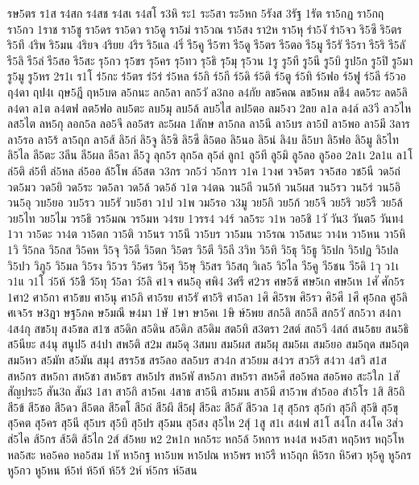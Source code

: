 {รษ5ตร
ร1ส
ร4สก
ร4สช
ร4สเ
ร4สโ
ร3หิ
ระ1
ระ5สา
ระ5หก
5รังส
3รัฐ
1รัต
รา5กฏ
รา5กฤ
รา5กว
1ราช
รา5ชู
รา5ดร
รา5ดว
รา5ดู
รา5ม่
รา5วณ
รา5สง
รา2ห
รา5หุ
รำ5งั
รำ5จว
ริ5ซึ
ริ5ตร
ริ5ทึ
4ริพ
ริ5มน
4ริยจ
4ริยย
4ริร
ริ5แล
4ริ่
รี5คู
รี5ฑา
รี5ดู
รี5ตร
รี5ตอ
รี5มู
รี5รั
รี5รา
รี5ริ
รี5ลั
รี5ลิ
รี5ล่
รี5สอ
รี5สะ
รุ5กว
รุ5ขร
รุ5คร
รุ5ทว
รุ5ธิ
รุ5มุ
รุ5วน
1รู
รู5ที
รู5นี
รู5บิ
รูป5ก
รู5ปิ
รู5มา
รู5มู
รู5หร
2ร1เ
ร1โ
ร่5กะ
ร่5ตร
ร่5ร่
ร่5หล
ร์5กิ
ร์5กี
ร์5ดิ
ร์5ติ
ร์5ตู
ร์5ทิ
ร์5ฟอ
ร์5ฟู
ร์5ลี
ร์5วอ
ฤ4ดา
ฤป4เ
ฤษ5ฎี
ฤห5บด
ล5กนะ
ลก5ลา
ลก5วั
ล3กอ
ล4กัย
ลข5คณ
ลข5หม
ลชี4
ลด5ระ
ลด5ลิ
ล4ดา
ล1ต
ล4ตฟ
ลต5ฟอ
ลบ5ตะ
ลบ5มุ
ลบ5ล้
ลบ5ไส
ลป5ตอ
ลม5งว
2ลย
ล1ล
ล4ล์
ล3วี
ลว5ไห
ลส5ไต
ลห5กุ
ลอก5ล
ลอ5จี
ลอ5สร
ละ5ผล
1ลักษ
ลา5กล
ลา5นี
ลา5บร
ลา5ป๋
ลา5พอ
ลา5มี
3ลาร
ลา5รอ
ลา5ร้
ลา5ฤก
ลา5ส้
ลิ5ก่
ลิ5จู
ลิ5ซิ
ลิ5ซึ
ลิ5ตอ
ลิ5นอ
ลิ5น่
ลิ4บ
ลิ5บา
ลิ5ฟอ
ลิ5มู
ลิ5ไท
ลิ5ไล
ลี5ตะ
3ลีน
ลี5ผล
ลี5ลา
ลี5วู
ลุก5ร
ลุก5ล
ลุ5ล่
ลูก1
ลู5ที
ลู5มิ
ลู5ลอ
ลู5ออ
2ล1เ
2ล1แ
ล1โ
ล่5ติ
ล่5ที
ล่5หล
ล่5ออ
ล้5โพ
ล์5สต
ว3กร
วก5ว่
ว5การ
ว1ค
1วงศ
วจ5ตร
วจ5สอ
วช5นี
วด5ถ่
วด5มว
วด5ยิ
วด5ระ
วด5ลา
วด5ล้
วด5อ้
ว1ต
ว4ตฉ
วน5ถี
วน5ท้
วน5ผส
วน5รว
วน5ร่
วน5อิ
วน5อุ
วบ5ยอ
วบ5รว
วบ5รั
วบ5ฮา
ว1ป
ว1พ
วม5รอ
ว3มู
วย5กิ
วย5ก้
วย5จี
วย5ริ
วย5รื
วย5ล้
วย5ไท
วย5ไม
วร5ธิ
วร5มณ
วร5มห
ว4รย
1วรร4
ว4ร์
วล5ระ
ว1ห
วอ5ชิ
1วั
วัน3
วันต5
วันท4
1วา
วา5ดะ
วา4ต
วา5ตก
วา5ติ
วา5นร
วา5นึ
วา5บร
วา5มน
วา5รณ
วา5สนะ
วา4ห
วา5หน
วา5หิ
1วิ
วิ5กล
วิ5กส
วิ5คห
วิ5จุ
วิ5ดี
วิ5ตก
วิ5ตร
วิ5ตี
วิ5ถี
3วิท
วิ5ทิ
วิ5ธุ
วิ5ธู
วิ5ปก
วิ5ปฏ
วิ5ปล
วิ5ปว
วิภู5
วิ5มล
วิ5รง
วิ5วร
วิ5ศร
วิ5ศุ
วิ5ษุ
วิ5สร
วิ5สฤ
วิเล5
วิ5ไล
วี5คู
วี5ชน
วี5ดิ
1วุ
ว1เ
ว1แ
ว1โ
ว่5ห้
ว้5ชื
ว้5ทุ
ว้5ลา
ว์5ลิ
ศ1จ
ศน5อุ
ศพิ4
3ศรี
ศ2วร
ศษ5ซ้
ศษ5เก
ศษ5เห
1ศั
ศัก5ร
1ศา2
ศา5กา
ศา5ขบ
ศา5นุ
ศา5ภิ
ศา5รย
ศา5รั
ศา5ริ
ศา5ลา
1ศิ
ศิ5รพ
ศิ5รว
ศิ5ศี
1ศึ
ศุ5กล
ศู5ลิ
ศเจ5ร
ษ3ฎา
ษฐ5ภค
ษ5มณี
ษ4มา
1ษั
1ษา
ษา5คเ
1ษิ
ษ์5พย
สก5ลิ
สก5ลึ
สก5วั
สก5วา
ส4กา
4ส4กุ
สข5บุ
สง5ขล
ส1ซ
ส5ดิก
ส5ดิน
ส5ดิภ
ส5ดิม
สต5ทิ
ส3ตรา
2สต์
สถ5วี
4สถ์
สน5ธย
สน5ธิ
ส5นียะ
ส4นุ
สนูป5
ส4ปา
สพ5ติ
ส2ม
สม5ดุ
3สมบ
สม5ผส
สม5ผุ
สม5ผเ
สม5ยอ
สม5ฤด
สม5ฤต
สม5หว
ส5มัท
ส5มัน
สมุ4
สรร5ช
สร5ลอ
สล5บร
สว4ก
สว5ยม
ส4วร
สว5ริ
ส4วา
4สวิ
ส1ส
สห5กร
สห5กา
สห5ชา
สห5ธร
สห5ปร
สห5พั
สห5ภา
สห5รา
สห5ศึ
สอ5พล
สอ5พอ
สะ5ใภ
1สั
สัญประ5
สัน3ถ
สัม3
1สา
สา5กิ
สา5คเ
4สาธ
สา5นึ
สา5มน
สา5มี
สา5วพ
สำ5ออ
สำ5โร
1สิ
สิ5ถิ
สี5ข้
สี5ชอ
สี5ดว
สี5ตล
สี5ตโ
สี5ถ่
สี5ผึ
สี5ฝุ
สี5ละ
สี5ลั
สี5วล
1สุ
สุ5กร
สุ5กำ
สุ5กี
สุ5ขิ
สุ5ขุ
สุ5คต
สุ5คร
สุ5นี
สุ5บร
สุ5บิ
สุ5ปร
สุ5มน
สุ5สง
สุ5ไห
2สุ์
1สู
ส1เ
ส4เฟ
ส1โ
ส4โก
ส4โค
3ส่ว
ส่5ไค
ส้5กร
ส้5ติ
ส้5ไก
2ส์
ส์5หย
ห2
2ห1ก
หก5ระ
หก5ล้
5หการ
หง4ส
หง5สา
หฤ5หร
หฤ5โห
หล5สะ
หอ5คอ
หอ5สม
1หั
หา5กฐ
หา5บพ
หา5ปณ
หา5พร
หา5รื
หา5ฤก
หิ5รก
หิ5ศว
หุ5คู
หู5กร
หู5กว
หู5หน
ห้5ท่
ห้5ท้
ห้5ร้
2ห์
ห์5กร
ห์5สน
}
